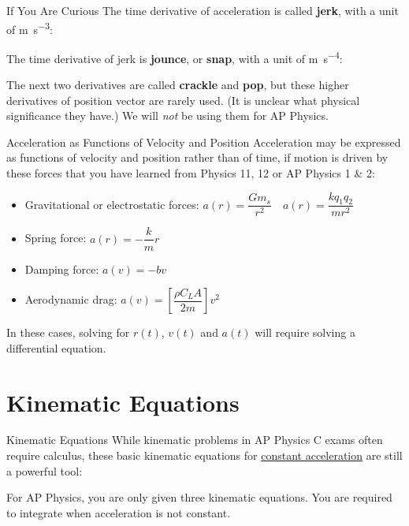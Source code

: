 \documentclass[12pt,compress,aspectratio=169,dvipsnames]{beamer}
\begin{document}
\begin{frame}{If You Are Curious}
  The time derivative of acceleration is called \textbf{jerk}, with a unit
  of \si{\metre\per\second\cubed}:


  The time derivative of jerk is \textbf{jounce}, or \textbf{snap}, with a
  unit of \si{\metre\per\second^4}:
  
  
  The next two derivatives are called \textbf{crackle} and
  \textbf{pop}, but these higher derivatives of position vector are rarely used.
  (It is unclear what physical significance they have.) We will \emph{not} be
  using them for AP Physics.
\end{frame}



\begin{frame}{Acceleration as Functions of Velocity and Position}
  Acceleration may be expressed as functions of velocity and position rather
  than of time, if motion is driven by these forces that you have learned from
  Physics 11, 12 or AP Physics 1 \& 2:
  \begin{itemize}
  \item Gravitational or electrostatic forces:
    $a(r)=\dfrac{Gm_s}{r^2}\quad a(r)=\dfrac{kq_1q_2}{mr^2}$
  \item Spring force: $a(r)=-\dfrac kmr$
  \item Damping force: $a(v)=-bv$
  \item Aerodynamic drag:
    $a(v)=\left[\dfrac{\rho C_L A}{2m}\right] v^2$
  \end{itemize}

  \vspace{.1in}In these cases, solving for $r(t)$, $v(t)$ and $a(t)$ will
  require solving a differential equation. %
\end{frame}



\section{Kinematic Equations}

\begin{frame}{Kinematic Equations}
  While kinematic problems in AP Physics C exams often require calculus, these
  basic kinematic equations for \underline{constant acceleration} are still a
  powerful tool:

  \vspace{-.25in}{\large
    \begin{align*}
      x &= x_0+ v_0t + \frac12at^2\\
      v &= v_0+at\\
      v^2 &= v_0^2+ 2a(x-x_0)
    \end{align*}
  }

  For AP Physics, you are only given three kinematic equations. You are
  required to integrate when acceleration is not constant.
\end{frame}
\end{document}

